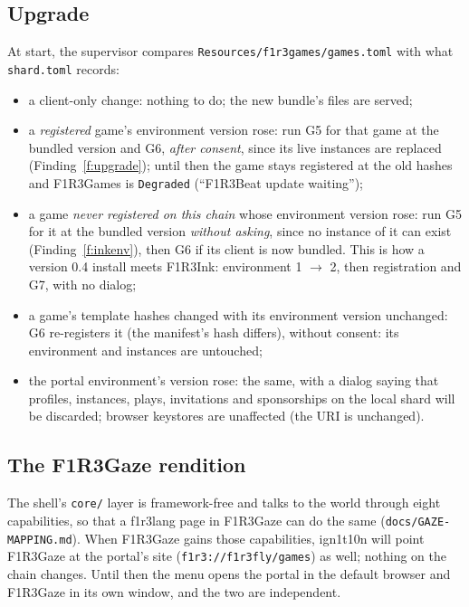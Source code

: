 \documentclass[11pt]{article}
\theoremstyle{definition}
\theoremstyle{remark}
\newcommand{\code}[1]{\texttt{#1}}
\newcommand{\Gz}{F1R3Gaze}
\newcommand{\Hr}{ign1t10n}
\newcommand{\Gm}{F1R3Games}
\begin{document}
\subsection{Upgrade}\label{sec:gupgrade}

At start, the supervisor compares \code{Resources/f1r3games/games.toml} with what
\code{shard.toml} records:

\begin{itemize}[nosep]
\item a client-only change: nothing to do; the new bundle's files are served;
\item a \emph{registered} game's environment version rose: run G5 for that game at
  the bundled version and G6, \emph{after consent}, since its live instances are
  replaced (Finding~\ref{f:upgrade}); until then the game stays registered at the old
  hashes and \Gm{} is \code{Degraded} (``F1R3Beat update waiting'');
\item a game \emph{never registered on this chain} whose environment version rose:
  run G5 for it at the bundled version \emph{without asking}, since no instance of it
  can exist (Finding~\ref{f:inkenv}), then G6 if its client is now bundled. This is
  how a version 0.4 install meets F1R3Ink: environment 1 $\to$ 2, then registration
  and G7, with no dialog;
\item a game's template hashes changed with its environment version unchanged: G6
  re-registers it (the manifest's hash differs), without consent: its environment and
  instances are untouched;
\item the portal environment's version rose: the same, with a dialog saying that
  profiles, instances, plays, invitations and sponsorships on the local shard will be
  discarded; browser keystores are unaffected (the URI is unchanged).
\end{itemize}

\subsection{The \Gz{} rendition}\label{sec:gazerendition}

The shell's \code{core/} layer is framework-free and talks to the world through eight
capabilities, so that a f1r3lang page in \Gz{} can do the same
(\code{docs/GAZE-MAPPING.md}). When \Gz{} gains those capabilities, \Hr{} will point
\Gz{} at the portal's site (\code{f1r3://f1r3fly/games}) as well; nothing on the chain
changes. Until then the menu opens the portal in the default browser and \Gz{} in its
own window, and the two are independent.
\end{document}

